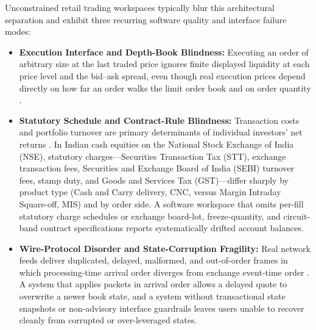 \documentclass[journal,onecolumn,10pt]{IEEEtran}
\begin{document}
Unconstrained retail trading workspaces typically blur this architectural separation and exhibit three recurring software quality and interface failure modes:
\begin{itemize}
  \item \textbf{Execution Interface and Depth-Book Blindness:} Executing an order of arbitrary size at the last traded price ignores finite displayed liquidity at each price level and the bid--ask spread, even though real execution prices depend directly on how far an order walks the limit order book and on order quantity \cite{almgren2001,kyle1985,glosten1985,cont2010}.
  \item \textbf{Statutory Schedule and Contract-Rule Blindness:} Transaction costs and portfolio turnover are primary determinants of individual investors' net returns \cite{barber2000,barber2002,barber2009}. In Indian cash equities on the National Stock Exchange of India (NSE), statutory charges—Securities Transaction Tax (STT), exchange transaction fees, Securities and Exchange Board of India (SEBI) turnover fees, stamp duty, and Goods and Services Tax (GST)—differ sharply by product type (Cash and Carry delivery, CNC, versus Margin Intraday Square-off, MIS) and by order side. A software workspace that omits per-fill statutory charge schedules or exchange board-lot, freeze-quantity, and circuit-band contract specifications reports systematically drifted account balances.
  \item \textbf{Wire-Protocol Disorder and State-Corruption Fragility:} Real network feeds deliver duplicated, delayed, malformed, and out-of-order frames in which processing-time arrival order diverges from exchange event-time order \cite{akidau2015,lamport1978,hasbrouck2013}. A system that applies packets in arrival order allows a delayed quote to overwrite a newer book state, and a system without transactional state snapshots or non-advisory interface guardrails leaves users unable to recover cleanly from corrupted or over-leveraged states.
\end{itemize}
\end{document}

